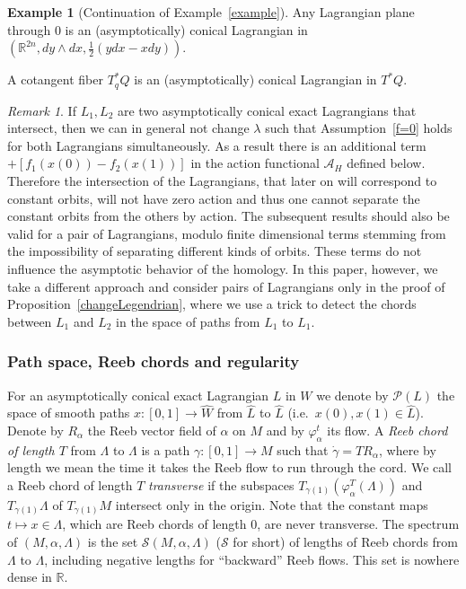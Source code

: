 \documentclass{amsart}
\newcommand{\Acal}{{\mathcal{A}}}
\newcommand{\Pcal}{{\mathcal{P}}}
\newcommand{\Scal}{{\mathcal{S}}}
\newcommand{\RR}{\mathbb{R}}
\newcommand{\haat}{\widehat}
\theoremstyle{definition}
\newtheorem{example}[proposition]{Example}
\theoremstyle{remark}
\newtheorem{remark}[proposition]{Remark}
\numberwithin{equation}{section}
\begin{document}
\begin{example}[Continuation of Example~\ref{example}]\label{exampl}
Any Lagrangian plane through 0 is an (asymptotically) conical Lagrangian in $(\RR^{2n},dy\wedge dx,\frac12(ydx-xdy))$.

A cotangent fiber $T^*_qQ$ is an (asymptotically) conical Lagrangian in $T^*Q$.
\end{example}

\begin{remark}
	If $L_1,L_2$ are two asymptotically conical exact Lagrangians that intersect, then we can in general not change $\lambda$ such that Assumption~\ref{f=0} holds for both Lagrangians simultaneously. As a result there is an additional term $+[f_1(x(0))-f_2(x(1))]$ in the action functional $\Acal_H$ defined below. Therefore the intersection of the Lagrangians, that later on will correspond to constant orbits, will not have zero action and thus one cannot separate the constant orbits from the others by action. The subsequent results should also be valid for a pair of Lagrangians, modulo finite dimensional terms stemming from the impossibility of separating different kinds of orbits. These terms do not influence the asymptotic behavior of the homology. In this paper, however, we take a different approach and consider pairs of Lagrangians only in the proof of Proposition~\ref{changeLegendrian}, where we use a trick to detect the chords between $L_1$ and $L_2$ in the space of paths from $L_1$ to $L_1$.
\end{remark}

\subsubsection*{Path space, Reeb chords and regularity}
For an asymptotically conical exact Lagrangian $L$ in $W$ we denote by $\Pcal(L)$ the space of smooth paths $x:[0,1]\to\haat W$ from $\haat L$ to $\haat L$ (i.e.\ $x(0),x(1)\in\haat L$). Denote by $R_\alpha$ the Reeb vector field of $\alpha$ on $M$ and by $\varphi_\alpha^t$ its flow. A {\it Reeb chord of length $T$} from $\Lambda$ to $\Lambda$ is a path $\gamma:[0,1]\to M$ such that $\dot\gamma=TR_\alpha$, where by length we mean the time it takes the Reeb flow to run through the cord. We call a Reeb chord of length $T$ {\it transverse} if the subspaces $T_{\gamma(1)}(\varphi_\alpha^T(\Lambda))$ and $T_{\gamma(1)}\Lambda$ of $T_{\gamma(1)}M$ intersect only in the origin. Note that the constant maps $t\mapsto x\in\Lambda$, which are Reeb chords of length 0, are never transverse. The spectrum of $(M,\alpha,\Lambda)$ is the set $\Scal(M,\alpha,\Lambda)$ ($\Scal$ for short) of lengths of Reeb chords from $\Lambda$ to $\Lambda$, including negative lengths for ``backward'' Reeb flows. This set is nowhere dense in $\RR$. 
\end{document}
